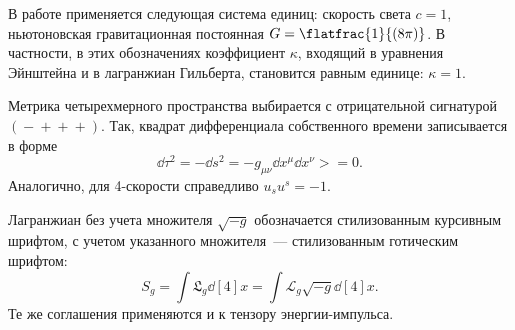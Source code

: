 \documentclass[\docroot/reports/draft/report.tex]{subfiles}
\begin{document}
    В работе применяется следующая система единиц: скорость света $c = 1$, ньютоновская гравитационная постоянная $G = \flatfrac{1}{(8 \pi)}$. В частности, в этих обозначениях коэффициент $\kappa$, входящий в уравнения Эйнштейна и в лагранжиан Гильберта, становится равным единице: $\kappa = 1$.

    Метрика четырехмерного пространства выбирается с отрицательной сигнатурой $(\mathrel{-}\mathrel{+}\mathrel{+}\mathrel{+})$. Так, квадрат дифференциала собственного времени записывается в форме
    \begin{equation*}
        \dd{\tau}^2 = - \dd{s}^2 = - g_{\mu\nu} \dd{x}^\mu \dd{x}^\nu >= 0 .
    \end{equation*}
    Аналогично, для 4-скорости справедливо $u_s u^s = -1$.

    Лагранжиан без учета множителя $\sqrt{-g}$ обозначается стилизованным курсивным шрифтом, с учетом указанного множителя~--- стилизованным готическим шрифтом:
    \begin{equation*}
        S_g = \int \mathfrak{L}_g \dd[4]{x} = \int \mathcal{L}_g \sqrt{-g} \dd[4]{x} .
    \end{equation*}
    Те же соглашения применяются и к тензору энергии-импульса.

\end{document}
